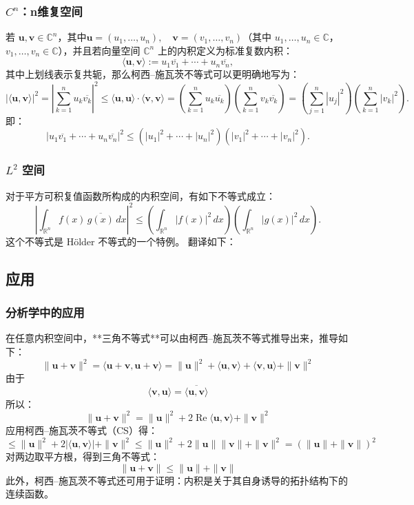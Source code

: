 \subsubsection{$C^n$：n维复空间}
若 $\mathbf{u}, \mathbf{v} \in \mathbb{C}^n$，其中$\mathbf{u} = (u_1, \ldots, u_n), \quad \mathbf{v} = (v_1, \ldots, v_n)$（其中 $u_1, \ldots, u_n \in \mathbb{C}$，$v_1, \ldots, v_n \in \mathbb{C}$），并且若向量空间 $\mathbb{C}^n$ 上的内积定义为标准复数内积：
$$
\langle \mathbf{u}, \mathbf{v} \rangle := u_1 \overline{v_1} + \cdots + u_n \overline{v_n},~
$$
其中上划线表示复共轭，那么柯西–施瓦茨不等式可以更明确地写为：
$$
\left| \langle \mathbf{u}, \mathbf{v} \rangle \right|^2 = \left| \sum_{k=1}^n u_k \overline{v_k} \right|^2 \leq \langle \mathbf{u}, \mathbf{u} \rangle \cdot \langle \mathbf{v}, \mathbf{v} \rangle = \left( \sum_{k=1}^n u_k \overline{u_k} \right) \left( \sum_{k=1}^n v_k \overline{v_k} \right) = \left( \sum_{j=1}^n |u_j|^2 \right) \left( \sum_{k=1}^n |v_k|^2 \right).~
$$
即：
$$
\left| u_1 \overline{v_1} + \cdots + u_n \overline{v_n} \right|^2 \leq \left( |u_1|^2 + \cdots + |u_n|^2 \right) \left( |v_1|^2 + \cdots + |v_n|^2 \right).~
$$
\subsubsection{$L^2$ 空间}
对于平方可积复值函数所构成的内积空间，有如下不等式成立：
$$
\left| \int_{\mathbb{R}^n} f(x)\, \overline{g(x)}\, dx \right|^2 \leq \left( \int_{\mathbb{R}^n} |f(x)|^2\, dx \right) \left( \int_{\mathbb{R}^n} |g(x)|^2\, dx \right).~
$$
这个不等式是 Hölder 不等式的一个特例。
翻译如下：
\subsection{应用}
\subsubsection{分析学中的应用}
在任意内积空间中，**三角不等式**可以由柯西–施瓦茨不等式推导出来，推导如下：
$$
\|\mathbf{u} + \mathbf{v} \|^2 = \langle \mathbf{u} + \mathbf{v}, \mathbf{u} + \mathbf{v} \rangle
= \|\mathbf{u}\|^2 + \langle \mathbf{u}, \mathbf{v} \rangle + \langle \mathbf{v}, \mathbf{u} \rangle + \|\mathbf{v}\|^2~
$$
由于
$$
\langle \mathbf{v}, \mathbf{u} \rangle = \overline{\langle \mathbf{u}, \mathbf{v} \rangle}~
$$
所以：
$$
\|\mathbf{u} + \mathbf{v} \|^2 = \|\mathbf{u}\|^2 + 2\operatorname{Re} \langle \mathbf{u}, \mathbf{v} \rangle + \|\mathbf{v}\|^2~
$$
应用柯西–施瓦茨不等式（CS）得：
$$
\leq \|\mathbf{u}\|^2 + 2|\langle \mathbf{u}, \mathbf{v} \rangle| + \|\mathbf{v}\|^2 
\leq \|\mathbf{u}\|^2 + 2\|\mathbf{u}\|\|\mathbf{v}\| + \|\mathbf{v}\|^2 
= (\|\mathbf{u}\| + \|\mathbf{v}\|)^2~
$$
对两边取平方根，得到三角不等式：
$$
\|\mathbf{u} + \mathbf{v} \| \leq \|\mathbf{u} \| + \|\mathbf{v} \|~
$$
此外，柯西–施瓦茨不等式还可用于证明：内积是关于其自身诱导的拓扑结构下的连续函数。
